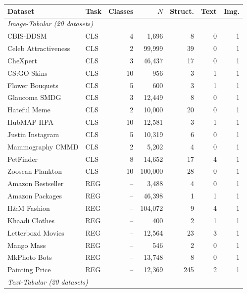 \documentclass{llmxive}
\begin{document}
\begin{table}
\centering
\footnotesize
\begin{tabular}{llrrrrr}
\toprule
Dataset & Task & Classes & $N$ & Struct. & Text & Img. \\
\midrule
\multicolumn{7}{l}{\textit{Image-Tabular (20 datasets)}} \\
\midrule
CBIS-DDSM                 & CLS &   4 &  1,696  &  8  &  0 & 1 \\
Celeb Attractiveness      & CLS &  2 & 99,999  & 39  &  0 & 1 \\
CheXpert                  & CLS &   3 & 46,437  & 17  &  0 & 1 \\
CS:GO Skins               & CLS &  10 &    956  &  3  &  1 & 1 \\
Flower Bouquets           & CLS &   5 &    600  &  3  &  1 & 1 \\
Glaucoma SMDG             & CLS &   3 & 12,449  &  8  &  0 & 1 \\
Hateful Meme              & CLS &  2 & 10,000  & 20  &  0 & 1 \\
HubMAP HPA                & CLS &  10 & 12,581  &  3  &  1 & 1 \\
Justin Instagram          & CLS &   5 & 10,319  &  6  &  0 & 1 \\
Mammography CMMD          & CLS &  2 &  5,202  &  4  &  0 & 1 \\
PetFinder                 & CLS &   8 & 14,652  & 17  &  4 & 1 \\
Zooscan Plankton          & CLS &  10 & 100,000 & 28  &  0 & 1 \\
Amazon Bestseller         & REG &  -- &  3,488  &  4  &  0 & 1 \\
Amazon Packages           & REG &  -- & 46,398  &  1  &  1 & 1 \\
H\&M Fashion              & REG &  -- & 104,072 &  9  &  4 & 1 \\
Khaadi Clothes            & REG &  -- &    400  &  2  &  1 & 1 \\
Letterboxd Movies         & REG &  -- & 12,564  & 23  &  3 & 1 \\
Mango Mass                & REG &  -- &    546  &  2  &  0 & 1 \\
MkPhoto Bots              & REG &  -- & 13,748  &  8  &  0 & 1 \\
Painting Price            & REG &  -- & 12,369  & 245 &  2 & 1 \\
\midrule
\multicolumn{7}{l}{\textit{Text-Tabular (20 datasets)}} \\
\midrule

\end{tabular}
\end{table}
\end{document}

